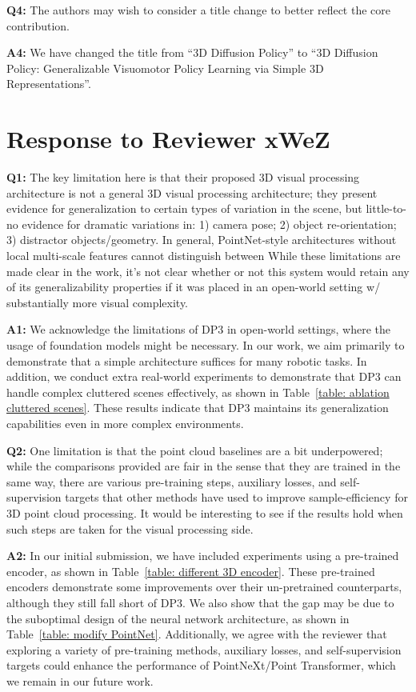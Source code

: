 \vspace{0.1in}


\noindent\textbf{Q4:} The authors may wish to consider a title change to better reflect the core contribution.


\noindent\textbf{A4:} We have changed the title from “3D Diffusion Policy” to “3D Diffusion Policy: Generalizable Visuomotor Policy Learning via Simple 3D Representations”.


\section*{Response to Reviewer xWeZ}
\noindent\textbf{Q1:} The key limitation here is that their proposed 3D visual processing architecture is not a general 3D visual processing architecture; they present evidence for generalization to certain types of variation in the scene, but little-to-no evidence for dramatic variations in: 1) camera pose; 2) object re-orientation; 3) distractor objects/geometry. In general, PointNet-style architectures without local multi-scale features cannot distinguish between While these limitations are made clear in the work, it’s not clear whether or not this system would retain any of its generalizability properties if it was placed in an open-world setting w/ substantially more visual complexity.

\noindent\textbf{A1:} 
We acknowledge the limitations of DP3 in open-world settings, where the usage of foundation models might be necessary. In our work, we aim primarily to demonstrate that a simple architecture suffices for many robotic tasks. In addition, we conduct extra real-world experiments to demonstrate that DP3 can handle complex cluttered scenes effectively, as shown in Table~\ref{table: ablation cluttered scenes}. These results indicate that DP3 maintains its generalization capabilities even in more complex environments.

\vspace{0.1in}

\noindent\textbf{Q2:} One limitation is that the point cloud baselines are a bit underpowered; while the comparisons provided are fair in the sense that they are trained in the same way, there are various pre-training steps, auxiliary losses, and self-supervision targets that other methods have used to improve sample-efficiency for 3D point cloud processing. It would be interesting to see if the results hold when such steps are taken for the visual processing side.


\noindent\textbf{A2:} 
In our initial submission, we have included experiments using a pre-trained encoder, as shown in Table~\ref{table: different 3D encoder}. These pre-trained encoders demonstrate some improvements over their un-pretrained counterparts, although they still fall short of DP3. We also show that the gap may be due to the suboptimal design of the neural network architecture, as shown in Table~\ref{table: modify PointNet}. Additionally, we agree with the reviewer that exploring a variety of pre-training methods, auxiliary losses, and self-supervision targets could enhance the performance of PointNeXt/Point Transformer, which we remain in our future work.

